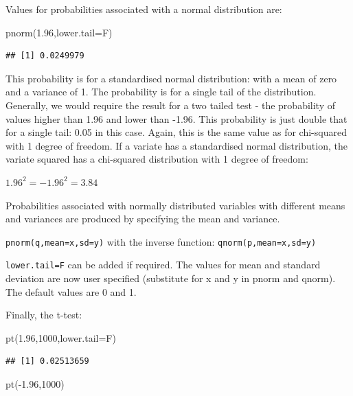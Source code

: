 \documentclass[
]{book}
\newenvironment{Shaded}{\begin{snugshade}}{\end{snugshade}}
\newcommand{\AttributeTok}[1]{\textcolor[rgb]{0.77,0.63,0.00}{#1}}
\newcommand{\DecValTok}[1]{\textcolor[rgb]{0.00,0.00,0.81}{#1}}
\newcommand{\FloatTok}[1]{\textcolor[rgb]{0.00,0.00,0.81}{#1}}
\newcommand{\FunctionTok}[1]{\textcolor[rgb]{0.00,0.00,0.00}{#1}}
\newcommand{\NormalTok}[1]{#1}
\newcommand{\SpecialCharTok}[1]{\textcolor[rgb]{0.00,0.00,0.00}{#1}}
\begin{document}
Values for probabilities associated with a normal distribution are:

\begin{Shaded}
\begin{Highlighting}[]
\FunctionTok{pnorm}\NormalTok{(}\FloatTok{1.96}\NormalTok{,}\AttributeTok{lower.tail=}\NormalTok{F)}
\end{Highlighting}
\end{Shaded}

\begin{verbatim}
## [1] 0.0249979
\end{verbatim}

This probability is for a standardised normal distribution: with a mean of zero and a variance of 1. The probability is for a single tail of the distribution. Generally, we would require the result for a two tailed test - the probability of values higher than 1.96 and lower than -1.96. This probability is just double that for a single tail: 0.05 in this case. Again, this is the same value as for chi-squared with 1 degree of freedom. If a variate has a standardised normal distribution, the variate squared has a chi-squared distribution with 1 degree of freedom:

\(1.96^2 = -1.96^2 = 3.84\)

Probabilities associated with normally distributed variables with different means and variances are produced by specifying the mean and variance.

\texttt{pnorm(q,mean=x,sd=y)} with the inverse function: \texttt{qnorm(p,mean=x,sd=y)}

\texttt{lower.tail=F} can be added if required. The values for mean and standard deviation are now user specified (substitute for x and y in pnorm and qnorm). The default values are 0 and 1.

Finally, the t-test:

\begin{Shaded}
\begin{Highlighting}[]
\FunctionTok{pt}\NormalTok{(}\FloatTok{1.96}\NormalTok{,}\DecValTok{1000}\NormalTok{,}\AttributeTok{lower.tail=}\NormalTok{F) }
\end{Highlighting}
\end{Shaded}

\begin{verbatim}
## [1] 0.02513659
\end{verbatim}

\begin{Shaded}
\begin{Highlighting}[]
\FunctionTok{pt}\NormalTok{(}\SpecialCharTok{{-}}\FloatTok{1.96}\NormalTok{,}\DecValTok{1000}\NormalTok{) }
\end{Highlighting}
\end{Shaded}
\end{document}
